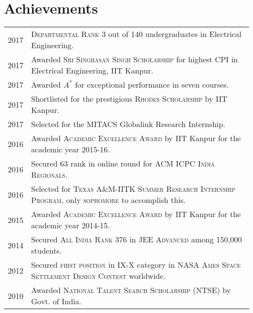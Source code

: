 \documentclass[a4paper,10pt]{article}
\begin{document}
\section{Achievements}
\begin{tabular}{rl}
2017 & \textsc{Departmental Rank 3} out of 140 undergraduates in Electrical
Engineering.\\
2017 & Awarded \textsc{Sri Singhasan Singh Scholarship} for highest CPI in Electrical Engineering, IIT Kanpur.\\
2017 & Awarded $A^*$ for exceptional performance in seven courses.\\
2017 & Shortlisted for the  prestigious \textsc{Rhodes Scholarship} by IIT Kanpur.\\
2017 & Selected for the MITACS Globalink Research Internship. \\
2016 & Awarded \textsc{Academic Excellence Award} by IIT Kanpur for the academic year 2015-16.\\
2016 & Secured 63 rank in online round for \textsc{ACM ICPC India Regionals}.\\
2016 & Selected for \textsc{Texas A\&M-IITK Summer Research Internship Program}, only \textsc{sophomore} to accomplish this.\\
2015 & Awarded \textsc{Academic Excellence Award} by IIT Kanpur for the academic year 2014-15.\\
2014 & Secured \textsc{All India Rank 376} in \textsc{JEE Advanced} among 150,000 students.\\
2012 & Secured \textsc{first position} in IX-X category in \textsc{NASA Ames Space Settlement Design Contest} worldwide.\\
2010 & Awarded \textsc{National Talent Search Scholarship} (NTSE) by Govt. of India.

\end{tabular}
\end{document}
